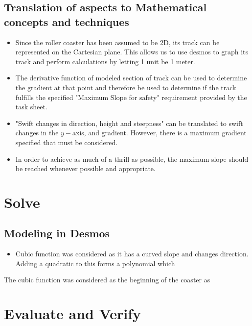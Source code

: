 \documentclass[11pt, letterpaper]{article}
\begin{document}
\subsection{Translation of aspects to Mathematical concepts and techniques}
\begin{itemize}
	\item Since the roller coaster has been assumed to be 2D, its track can be represented on the Cartesian plane. This allows us to use desmos to graph its track and perform calculations by letting 1 unit be 1 meter. 
	\item The derivative function of modeled section of track can be used to determine the gradient at that point and therefore be used to determine if the track fulfills the specified "Maximum Slope for safety" requirement provided by the task sheet.
	\item "Swift changes in direction, height and steepness" can be translated to swift changes in the $y-$axis, and gradient. However, there is a maximum gradient specified that must be considered. 
	\item In order to achieve as much of a thrill as possible, the maximum slope should be reached whenever possible and appropriate.

\end{itemize}


\section{Solve}
\subsection{Modeling in Desmos}
\begin{itemize}
	\item Cubic function was considered as it has a curved slope and changes direction. Adding a quadratic to this forms a polynomial which 
\end{itemize}
The cubic function was considered as the beginning of the coaster as 



\section{Evaluate and Verify}
\end{document}
